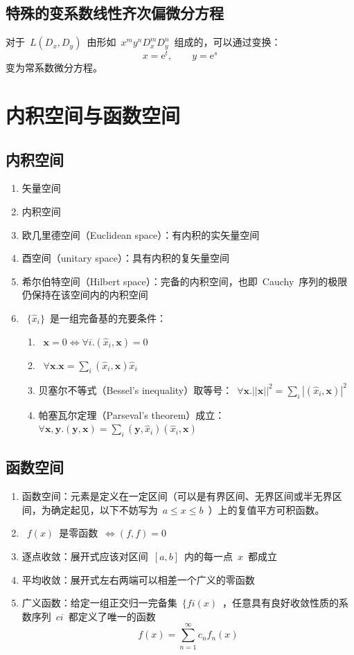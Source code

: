 \documentclass[12pt,a4paper]{article}
\renewcommand*{\vec}[1]{\bm{#1}}%
\renewcommand{\[}{\ $\displaystyle}
\renewcommand{\]}{$\ }%
\newcommand\e{\mathrm{e}}
\newcommand{\summ}[2][n]{\sum_{#1=#2}^\infty}
\begin{document}
     \subsection{特殊的变系数线性齐次偏微分方程}
      对于\[L(D_x, D_y)\]由形如\[x^my^nD_x^mD_y^n\]组成的，可以通过变换：
      $$
        x = \e^t,\qquad y = \e^s
      $$
      变为常系数微分方程。
 
\section{内积空间与函数空间}
	\subsection{内积空间}
	\begin{enumerate}
	 \item 矢量空间
	 \item 内积空间
	 \item 欧几里德空间（Euclidean space）：有内积的实矢量空间
	 \item 酉空间（unitary space）：具有内积的复矢量空间
	 \item 希尔伯特空间（Hilbert space）：完备的内积空间，也即~Cauchy~序列的极限仍保持在该空间内的内积空间
	 \item \[\{\hat x_i\}\]是一组完备基的充要条件：
	 	\begin{enumerate}
	 	 \item \[\vec x=0 \Leftrightarrow \forall i.(\hat x_i,\vec x) = 0\]
	 	 \item \[\forall \vec x.\vec x= \sum_i (\hat x_i,\vec x)\hat x_i\]
	 	 \item 贝塞尔不等式（Bessel's inequality）取等号：\[\forall \vec x. ||\vec x||^2 = \sum_i |(\hat x_i,\vec x)|^2\]
	 	 \item 帕塞瓦尔定理（Parseval's theorem）成立：\[\forall \vec x,\vec y. (\vec y,\vec x) = \sum_i (\vec y,\hat x_i)(\hat x_i,\vec x)\]
	 	\end{enumerate}
	 \end{enumerate}
	 
	 \subsection{函数空间}
	 \begin{enumerate}
	 \item 函数空间：元素是定义在一定区间（可以是有界区间、无界区间或半无界区间，为确定起见，以下不妨写为\[a\le x \le b\]）上的复值平方可积函数。
	 \item \[f(x)\]是零函数\[\Leftrightarrow (f,f) = 0\]
	 \item 逐点收敛：展开式应该对区间\[[a, b]\]内的每一点\[x\]都成立
	 \item 平均收敛：展开式左右两端可以相差一个广义的零函数
	 \item 广义函数：给定一组正交归一完备集\[\{fi(x)\]，任意具有良好收敛性质的系数序列\[ci\]都定义了唯一的函数
	 	$$
	 	  f(x) = \summ{1} c_nf_n(x)
	 	$$
	 \end{enumerate}
\end{document}
